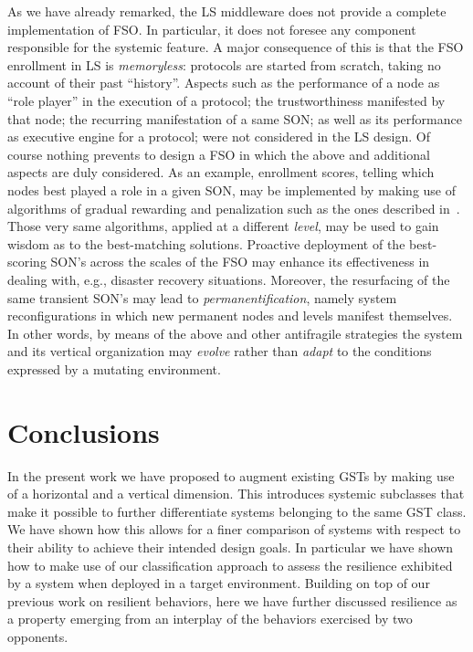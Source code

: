 \documentclass[twocolumn]{svjour3}
\def\K{\hbox{}}
\begin{document}
As we have already remarked, the LS middleware does not provide a complete implementation of
FSO. In particular, it does not foresee any component responsible for
the \K{} systemic feature. A major consequence of this is that the FSO enrollment in LS
is \emph{memoryless}: protocols are started from scratch, taking no account of their past ``history''.
Aspects such as the performance of a node as ``role player'' in the execution of a protocol; the
trustworthiness manifested by that node; the recurring manifestation of a same SON;
as well as its performance as executive engine for a protocol; were not considered in the LS design.
Of course nothing prevents to design a FSO in which the above and additional aspects are duly considered.
As an example, enrollment scores, telling which nodes best played a role in a given SON, may be
implemented by making use of algorithms of gradual rewarding and penalization such as the ones
described in~\cite{BDB11a,BDFB12,Buys15}. Those very same algorithms, applied at a different \emph{level},
may be used to gain wisdom as to the best-matching solutions. Proactive deployment of the best-scoring
SON's across the scales of the FSO may enhance its effectiveness in dealing with, e.g., disaster
recovery situations. Moreover, the resurfacing of the same transient SON's may lead to
\emph{permanentification}, namely system reconfigurations in which new permanent nodes and levels manifest
themselves. In other words, by means of the above and other antifragile strategies the system
and its vertical organization may \emph{evolve\/} rather than \emph{adapt\/} to the conditions expressed by a
mutating environment.














\section{Conclusions}\label{s:end}
In the present work
we have proposed to augment existing GSTs by making use of a horizontal and a vertical dimension.
This introduces systemic subclasses that make it possible to further differentiate
systems belonging to the same GST class. We have shown how this allows for a finer comparison of
systems with respect to their ability to achieve their intended design goals.
In particular we have shown how to make use of our classification approach to
assess the resilience exhibited by a system when deployed in a target environment.
Building on top of our previous work on resilient behaviors, here we have further
discussed resilience as a property emerging from an interplay of the behaviors exercised
by two opponents. 
\end{document}
